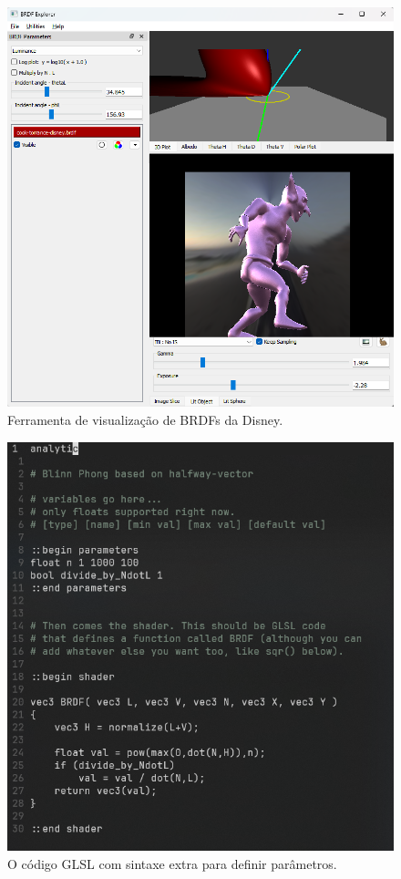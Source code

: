 \begin{figure}[htb]
        \caption{\label{fig-disney-tool} \small Ferramenta de visualização de BRDFs da Disney.}
        \begin{center}
            \includegraphics[scale=0.65]{./Imagens/disney-brdf-tool-original.png}
        \end{center}
\end{figure}


\begin{figure}[h]
        \caption{\label{fig-disney-code} \small O código GLSL com sintaxe extra para definir parâmetros.}
        \begin{center}
            \includegraphics[scale=0.7]{./Imagens/disney-brdf-code.png}
        \end{center}
\end{figure}


